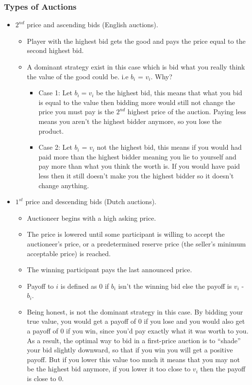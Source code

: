 \subsubsection{\textbf{Types of Auctions}}
\begin{itemize}
    \item $2^{nd}$ price and ascending bids (English auctions).
    \begin{itemize}
        \item Player with the highest bid gets the good and pays the price equal to the second highest bid. 
        \item A dominant strategy exist in this case which is bid what you really think the value of the good could be. i.e $b_i$ = $v_i$. Why? 
        \begin{itemize}
            \item Case 1: Let $b_i = v_i$ be the highest bid, this means that what you bid is equal to the value then bidding more would still not change the price you must pay is the $2^{nd}$ highest price of the auction. Paying less means you aren't the highest bidder anymore, so you lose the product.
            \item Case 2: Let $b_i$ = $v_i$ not the highest bid, this means if you would had paid more than the highest bidder meaning you lie to yourself and pay more than what you think the worth is. If you would have paid less then it still doesn't make you the highest bidder so it doesn't change anything.
        \end{itemize}
    \end{itemize}
    \item $1^{st}$ price and descending bids (Dutch auctions).
    \begin{itemize}
        \item Auctioneer begins with a high asking price.
        \item The price is lowered until some participant is willing to accept the auctioneer's price, or a predetermined reserve price (the seller's minimum acceptable price) is reached. 
        \item The winning participant pays the last announced price.
        \item Payoff to $i$ is defined as 0 if $b_i$ isn't the winning bid else the payoff is $v_i$ - $b_i$.
        \item Being honest, is not the dominant strategy in this case. By bidding your true value, you would get a payoff of 0 if you lose and you would also get a payoff of 0 if you win, since you’d pay exactly what it was worth to you. As a result, the optimal way to bid in a first-price auction is to “shade” your bid slightly downward, so that if you win you will get a positive payoff. But if you lower this value too much it means that you may not be the highest bid anymore, if you lower it too close to $v_i$ then the payoff is close to $0$.
    \end{itemize}
\end{itemize}

